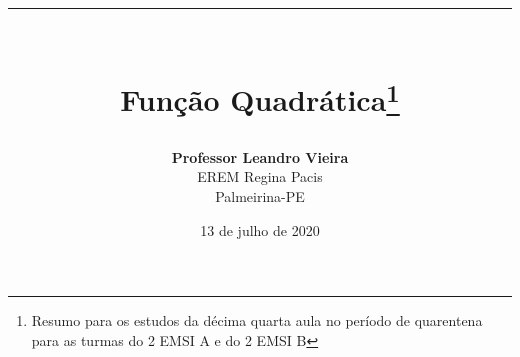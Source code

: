 \usepackage[english,brazilian]{babel}
\usepackage[alf]{abntex2cite}
\usepackage[utf8]{inputenc}
\usepackage[T1]{fontenc}
\usepackage[top=25mm, bottom=25mm, left=25mm, right=25mm]{geometry}
\usepackage{framed}
\usepackage{booktabs}
\usepackage{color}
\usepackage{hyperref}
\usepackage{graphicx}
\usepackage{amsfonts}
\usepackage{subfigure}
\usepackage{enumerate}
\usepackage{float}
\graphicspath{{./Figuras/}}    

\usepackage{pgf,tikz}
\usetikzlibrary{arrows}

\usepackage{multicol}
\setlength{\columnseprule}{0pt}

\usepackage{fancyhdr}
\lhead{\rightmark}
\renewcommand{\footrulewidth}{0.5pt}

\setlength{\parindent}{1.25cm}%

\pagestyle{fancy}
\def\MakeUppercase{} %


\usepackage{amsthm}
\newtheorem{exemplo}{Exemplo}

\usepackage[skip=10pt]{caption}

\newcommand{\LINHAHORIZONTAL}{\center \rule{16cm}{1.25pt}}

\newcommand{\frase}{\flushright{\textit{"As pessoas que são verdadeiramente fortes elevam os outros.\\Pessoas verdadeiramente poderosas unem os outros."}}\\\textbf{Malcolm X}}
\newcommand{\FRASE}{\begin{verse} \frase \end{verse}}

\author{\textbf{Professor Leandro Vieira}\\EREM Regina Pacis\\Palmeirina-PE}
\date{13 de julho de 2020}

\title{\LINHAHORIZONTAL \\\textbf{Função Quadrática}\footnote{Resumo para os estudos da décima quarta aula no período de quarentena para as turmas do 2 EMSI A e do 2 EMSI B}}

\newcommand{\m}[1]{\({#1}\)}
\newcommand{\M}[1]{\[{#1}\]}
\newcommand{\sol}{\noindent \textbf{Solução }}